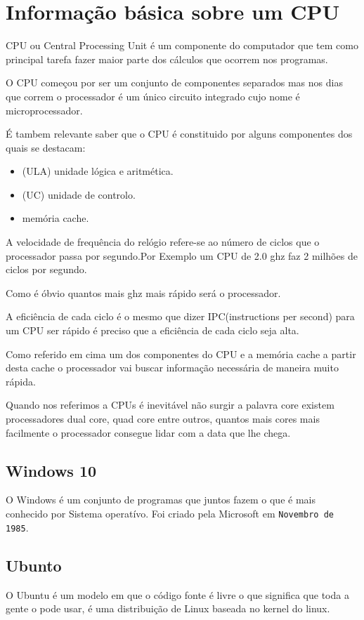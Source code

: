 \documentclass{report}
\begin{document}
\section{Informação básica sobre um CPU}
CPU ou Central Processing Unit é um componente do computador que tem como principal tarefa fazer maior parte dos cálculos que ocorrem nos programas.

O CPU começou por ser um conjunto de componentes separados mas nos dias que correm o processador é um único circuito integrado cujo nome é microprocessador.

É tambem relevante saber que o CPU é constituido por alguns componentes dos quais se destacam:
\begin{itemize}
\item (ULA) unidade lógica e aritmética.
\item (UC) unidade de controlo.
\item memória cache.
\end{itemize}
A velocidade de frequência do relógio refere-se ao número de ciclos que o processador passa por segundo.Por Exemplo um CPU de 2.0 ghz faz 2 milhões de ciclos por segundo.

Como é óbvio quantos mais ghz mais rápido será o processador.

A eficiência de cada ciclo é o mesmo que dizer IPC(instructions per second) para um CPU ser rápido é preciso que a eficiência de cada ciclo seja alta.

Como referido em cima um dos componentes do CPU e a memória cache
a partir desta cache o processador vai buscar informação necessária de maneira muito rápida.

Quando nos referimos a CPUs é inevitável não surgir a palavra core existem processadores dual core, quad core entre outros, quantos mais cores mais facilmente o processador consegue lidar com a data que lhe chega.

\subsection{Windows 10}
O Windows é um conjunto de programas que juntos fazem o que é mais conhecido por Sistema operatívo.
Foi criado pela Microsoft em \texttt{Novembro de 1985}.
\subsection{Ubunto}
O Ubuntu é um modelo em que o código fonte é livre o que significa que toda a gente o pode usar, é uma distribuição de Linux baseada no kernel do linux.
\end{document}
